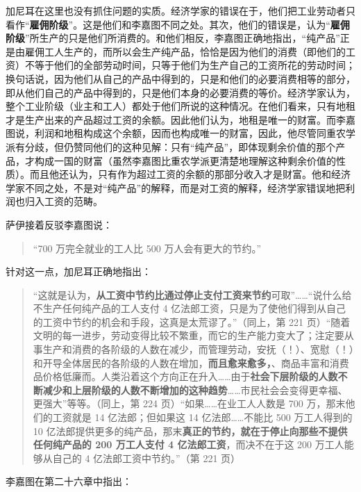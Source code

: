 加尼耳在这里也没有抓住问题的实质。经济学家的错误在于，他们把工业劳动者只看作“\textbf{雇佣阶级}”。这是他们和李嘉图不同之处。其次，他们的错误是，认为“\textbf{雇佣阶级}”所生产的只是他们所消费的。和他们相反，李嘉图正确地指出，“纯产品”正是由雇佣工人生产的，而所以会生产纯产品，恰恰是因为他们的消费（即他们的工资）不等于他们的全部劳动时间，只等于他们为生产自己的工资所花的劳动时间；换句话说，因为他们从自己的产品中得到的，只是和他们的必要消费相等的部分，即从他们自己的产品中得到的，只是他们本身的必要消费的等价。经济学家认为，整个工业阶级（业主和工人）都处于他们所说的这种情况。在他们看来，只有地租才是生产出来的产品超过工资的余额。因此他们认为，地租是唯一的财富。而李嘉图说，利润和地租构成这个余额，因而也构成唯一的财富，因此，他尽管同重农学派有分歧，但仍赞同他们的这种见解：只有“纯产品”，即体现剩余价值的那个产品，才构成一国的财富（虽然李嘉图比重农学派更清楚地理解这种剩余价值的性质）。而且他还认为，只有作为超过工资的余额的那部分收入才是财富。他和经济学家不同之处，不是对“纯产品”的解释，而是对工资的解释，经济学家错误地把利润也归入工资的范畴。

萨伊接着反驳李嘉图说：

\begin{quote}“700 万完全就业的工人比 500 万人会有更大的节约。”\end{quote}

针对这一点，加尼耳正确地指出：

\begin{quote}“这就是认为，\textbf{从工资中节约比通过停止支付工资来节约}可取”……“说什么给不生产任何纯产品的工人支付 4 亿法郎工资，只是为了使他们得到从自己的工资中节约的机会和手段，这真是太荒谬了。”（同上，第 221 页）“随着文明的每一进步，劳动变得比较不繁重，而它的生产能力变大了；注定要从事生产和消费的各阶级的人数在减少，而管理劳动，安抚（！）、宽慰（！）和开导全体居民的各阶级的人数在增加，\textbf{而且愈来愈多，}、商品丰富和消费品价格低廉而。人类沿着这个方向正在升入……由于\textbf{社会下层阶级的人数不断减少和上层阶级的人数不断增加的这种趋势}……市民社会会变得更幸福、更强大”等等。（同上，第 224 页）“如果……在业工人人数是 700 万，那末他们的工资就是 14 亿法郎；但如果这 14 亿法郎……不能比 500 万工人得到的 10 亿法郎提供更多的纯产品，那末\textbf{真正的节约，就在于停止向那些不提供任何纯产品的 200 万工人支付 4 亿法郎工资}，而决不在于这 200 万工人能够从自己的 4 亿法郎工资中节约。”（第 221 页）\end{quote}

李嘉图在第二十六章中指出：

